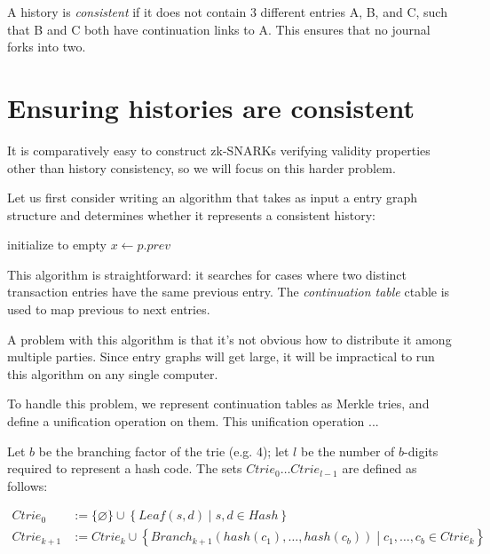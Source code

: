 \documentclass{article}
\begin{document}
A history is \emph{consistent} if it does not contain 3 different entries A, B, and C, such that B and C both have continuation links to A.  This ensures that no journal forks into two.

\section{Ensuring histories are consistent}

It is comparatively easy to construct zk-SNARKs verifying validity properties other than history consistency, so we will focus on this harder problem.

Let us first consider writing an algorithm that takes as input a entry graph structure and determines whether it represents a consistent history:

\begin{algorithm}
  initialize \Ctable to empty\;
   {
     {
      $x \gets p.prev$ 
    }
  }
  \;
\end{algorithm}

This algorithm is straightforward: it searches for cases where two distinct transaction entries have the same previous entry.  The \emph{continuation table} \textsf{ctable} is used to map previous to next entries.

A problem with this algorithm is that it's not obvious how to distribute it among multiple parties.  Since entry graphs will get large, it will be impractical to run this algorithm on any single computer.

To handle this problem, we represent continuation tables as Merkle tries, and define a unification operation on them.  This unification operation ...

Let $b$ be the branching factor of the trie (e.g. 4); let $l$ be the number of $b$-digits required to represent a hash code.  The sets $Ctrie_0 \ldots Ctrie_{l-1}$ are defined as follows:

\begin{align*}
  Ctrie_0 &:= \{ \varnothing \} \cup \left\{ Leaf(s, d) \middle| s, d \in Hash \right\} \\
  Ctrie_{k+1} &:= Ctrie_k \cup \left\{ Branch_{k+1}(hash(c_1), \ldots, hash(c_b)) \middle| c_1, \ldots, c_b \in Ctrie_k \right\}
\end{align*}
\end{document}
